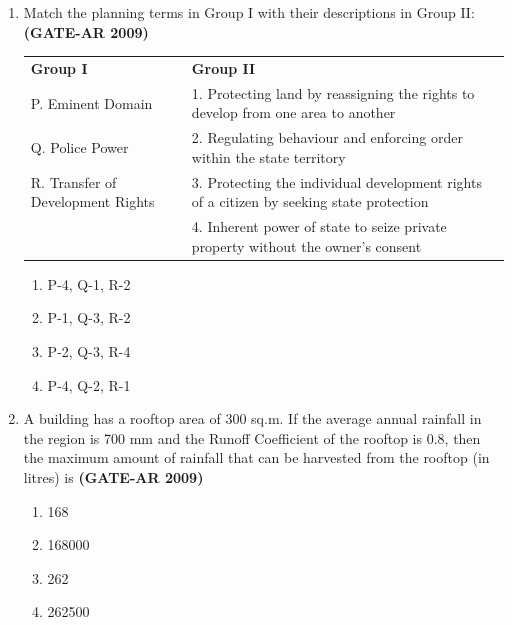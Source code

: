\documentclass[a4paper,10pt]{article}
\begin{document}
\begin{enumerate}
    \item Match the planning terms in Group I with their descriptions in Group II: \hfill \textbf{(GATE-AR 2009)} \\
    \begin{tabular}{ l l }
	\textbf{Group I} & \textbf{Group II} \\
	P. Eminent Domain & 1. Protecting land by reassigning the rights to develop from one area to another \\
	Q. Police Power & 2. Regulating behaviour and enforcing order within the state territory \\
	R. Transfer of Development Rights & 3. Protecting the individual development rights of a citizen by seeking state protection \\
	& 4. Inherent power of state to seize private property without the owner’s consent \\
	\end{tabular}
	\begin{multicols}{2}
	\begin{enumerate}
        \item P-4, Q-1, R-2
        \item P-1, Q-3, R-2
        \item P-2, Q-3, R-4
        \item P-4, Q-2, R-1
    \end{enumerate}
	\end{multicols}

    \item A building has a rooftop area of 300 sq.m. If the average annual rainfall in the region is 700 mm and the Runoff Coefficient of the rooftop is 0.8, then the maximum amount of rainfall that can be harvested from the rooftop (in litres) is \hfill \textbf{(GATE-AR 2009)}
    \begin{multicols}{2}
	\begin{enumerate}
        \item 168
        \item 168000
        \item 262
        \item 262500
    \end{enumerate}
	\end{multicols}


\end{enumerate}
\end{document}

